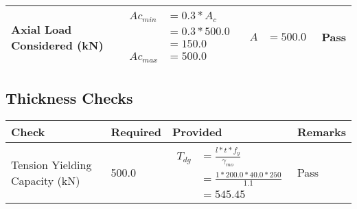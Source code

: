 \documentclass{article}%
\begin{document}
\begin{longtable}{|p{2.5cm}|p{4.5cm}|p{8cm}|p{1cm}|}
\hline%
Axial Load Considered (kN)&$\begin{aligned} Ac_{min} &= 0.3 * A_c\\ &= 0.3 *500.0\\ &=150.0\\ Ac_{max} &=500.0\end{aligned}$&$\begin{aligned} A &=500.0\end{aligned}$&Pass\\%
\hline%
\end{longtable}

%
\newpage%
\subsection{Thickness Checks}%
\label{subsec:ThicknessChecks}%
\renewcommand{\arraystretch}{1.2}%
\begin{longtable}{|p{2.5cm}|p{5cm}|p{7.5cm}|p{1cm}|}%
\hline%
\rowcolor{OsdagGreen}%
Check&Required&Provided&Remarks\\%
\hline%
\endhead%
\hline%
Tension Yielding Capacity (kN)&500.0&$\begin{aligned} T_{dg} &= \frac{l*t*f_y}{\gamma_{mo}}\\ &=\frac{1*200.0*40.0*250}{1.1}\\ &=545.45\end{aligned}$&Pass\\%
\hline%
\end{longtable}

%
\newpage%
\end{document}
